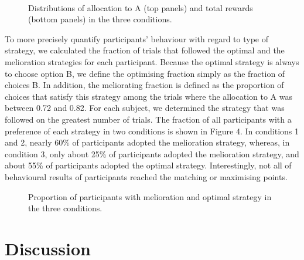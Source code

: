 \documentclass[twocolumn]{article}
\begin{document}
\begin{figure}
    \centering
    \begin{subfigure}[b]{0.45\textwidth}
    \end{subfigure}
    ~ 
    \begin{subfigure}[b]{0.45\textwidth}
    \end{subfigure}
 
    \caption{Distributions of allocation to A (top panels) and total rewards (bottom panels) in the three conditions.}
\end{figure}

To more precisely quantify participants' behaviour with regard to type
of strategy, we calculated the fraction of trials that followed the
optimal and the melioration strategies for each participant. Because
the optimal strategy is always to choose option B, we define the
optimising fraction simply as the fraction of choices B. In addition,
the meliorating fraction is defined as the proportion of choices that
satisfy this strategy among the trials where the allocation to A was
between 0.72 and 0.82. For each subject, we determined the strategy
that was followed on the greatest number of trials. The fraction of
all participants with a preference of each strategy in two conditions
is shown in Figure 4. In conditions 1 and 2, nearly 60\% of
participants adopted the melioration strategy, whereas, in condition
3, only about 25\% of participants adopted the melioration strategy,
and about 55\% of participants adopted the optimal
strategy. Interestingly, not all of behavioural results of
participants reached the matching or maximising points.

\begin{figure}[t!]
\caption{Proportion of participants with melioration and optimal strategy in the three conditions.}
\end{figure}

\section{Discussion}
\end{document}
